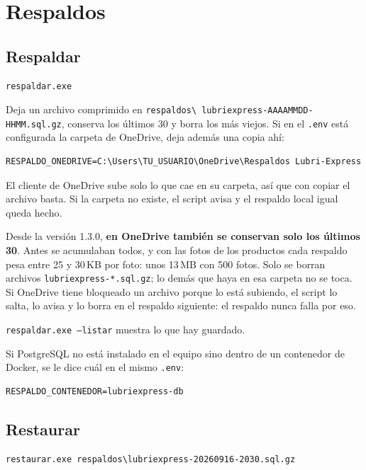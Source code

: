 \documentclass[11pt,a4paper]{article}
\begin{document}
\section{Respaldos}

\subsection{Respaldar}

\begin{lstlisting}
respaldar.exe
\end{lstlisting}

Deja un archivo comprimido en \texttt{respaldos\textbackslash
lubriexpress-AAAAMMDD-HHMM.sql.gz}, conserva los últimos 30 y borra los más
viejos. Si en el \texttt{.env} está configurada la carpeta de OneDrive, deja
además una copia ahí:

\begin{lstlisting}
RESPALDO_ONEDRIVE=C:\Users\TU_USUARIO\OneDrive\Respaldos Lubri-Express
\end{lstlisting}

El cliente de OneDrive sube solo lo que cae en su carpeta, así que con copiar el
archivo basta. Si la carpeta no existe, el script avisa y el respaldo local
igual queda hecho.

Desde la versión 1.3.0, \textbf{en OneDrive también se conservan solo los
últimos 30}. Antes se acumulaban todos, y con las fotos de los productos cada
respaldo pesa entre 25 y 30\,KB por foto: unos 13\,MB con 500 fotos. Solo se
borran archivos \texttt{lubriexpress-*.sql.gz}; lo demás que haya en esa carpeta
no se toca. Si OneDrive tiene bloqueado un archivo porque lo está subiendo, el
script lo salta, lo avisa y lo borra en el respaldo siguiente: el respaldo
nunca falla por eso.

\texttt{respaldar.exe --listar} muestra lo que hay guardado.

Si PostgreSQL no está instalado en el equipo sino dentro de un contenedor de
Docker, se le dice cuál en el mismo \texttt{.env}:

\begin{lstlisting}
RESPALDO_CONTENEDOR=lubriexpress-db
\end{lstlisting}

\subsection{Restaurar}

\begin{lstlisting}
restaurar.exe respaldos\lubriexpress-20260916-2030.sql.gz
\end{lstlisting}
\end{document}

